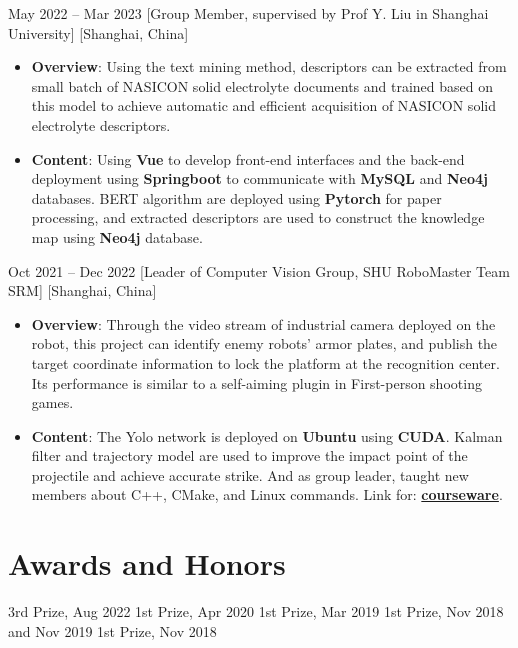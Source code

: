 \documentclass{chicv}
\begin{document}
  {May 2022 -- Mar 2023}
  [Group Member, supervised by Prof Y. Liu in Shanghai University]
  [Shanghai, China]
  \begin{itemize}
    \item \textbf{Overview}: Using the text mining method, descriptors can be extracted from small batch of NASICON solid electrolyte documents and trained based on this model to achieve automatic and efficient acquisition of NASICON solid electrolyte descriptors.
    \item \textbf{Content}: Using \textbf{Vue} to develop front-end interfaces and the back-end deployment using \textbf{Springboot} to communicate with \textbf{MySQL} and \textbf{Neo4j} databases. BERT algorithm are deployed using \textbf{Pytorch} for paper processing, and extracted descriptors are used to construct the knowledge map using \textbf{Neo4j} database.
  \end{itemize}

  {Oct 2021 -- Dec 2022}
  [Leader of Computer Vision Group, SHU RoboMaster Team SRM]
  [Shanghai, China]
  \begin{itemize}
    \item \textbf{Overview}: Through the video stream of industrial camera deployed on the robot, this project can identify enemy robots' armor plates, and publish the target coordinate information to lock the platform at the recognition center. Its performance is similar to a self-aiming plugin in First-person shooting games.
    \item \textbf{Content}: The Yolo network is deployed on \textbf{Ubuntu} using \textbf{CUDA}. Kalman filter and trajectory model are used to improve the impact point of the projectile and achieve accurate strike. And as group leader, taught new members about C++, CMake, and Linux commands. Link for: \href{https://shuzheking.github.io/documents.html}{\textbf{courseware}}.
  \end{itemize}

\section{Awards and Honors}
 {3rd Prize, Aug 2022}
 {1st Prize, Apr 2020}
 {1st Prize, Mar 2019}
 {1st Prize, Nov 2018 and Nov 2019}
 {1st Prize, Nov 2018}
\end{document}
